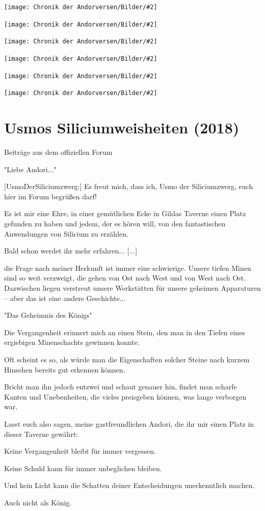\documentclass[10pt, a4paper, oneside]{book}
\newcommand{\fillbreak}{\vspace*{\fill}\columnbreak}
\newcommand{\storytext}[1]{%
    \section{#1}%
    \label{Storytext: #1}%
}
\newcommand{\bildmitts}[2][height=0.32\textwidth,width=0.48\textwidth,keepaspectratio]{%
    \begin{center}
        \texttt{[image: Chronik der Andorversen/Bilder/\#2]}
    \end{center}
}
\begin{document}
\begin{multicols}{2}
\bildmitts{Generic Artwork 1.jpg}
\bildmitts{Generic Artwork 2.jpg}
\bildmitts{Generic Artwork 3.jpg}
\bildmitts{Generic Artwork 4.jpg}
\bildmitts{Artwork Eara Thorn Trolle.jpg}
\bildmitts{Generic Artwork 5.jpg}





\fillbreak
\storytext{Usmos Siliciumweisheiten (2018)}

\begin{center}
    Beiträge aus dem offiziellen Forum

    "Liebe Andori..."
\end{center}

[UsmoDerSiliciumzwerg:] Es freut mich, dass ich, Usmo der Siliciumzwerg, euch hier im Forum begrüßen darf!

Es ist mir eine Ehre, in einer gemütlichen Ecke in Gildas Taverne einen Platz gefunden zu haben und jedem, der es hören will, von den fantastischen Anwendungen von Silicium zu erzählen.

Bald schon werdet ihr mehr erfahren... [...]

die Frage nach meiner Herkunft ist immer eine schwierige. Unsere tiefen Minen sind so weit verzweigt, die gehen von Ost nach West und von West nach Ost. Dazwischen liegen verstreut unsere Werkstätten für unsere geheimen Apparaturen – aber das ist eine andere Geschichte...


\begin{center}
    "Das Geheimnis des Königs"
\end{center}

Die Vergangenheit erinnert mich an einen Stein, den man in den Tiefen eines ergiebigen Minenschachts gewinnen konnte. 

Oft scheint es so, als würde man die Eigenschaften solcher Steine nach kurzem Hinsehen bereits gut erkennen können.

Bricht man ihn jedoch entzwei und schaut genauer hin, findet man scharfe Kanten und Unebenheiten, die vieles preisgeben können, was lange verborgen war.

Lasst euch also sagen, meine gastfreundlichen Andori, die ihr mir einen Platz in dieser Taverne gewährt:

Keine Vergangenheit bleibt für immer vergessen.

Keine Schuld kann für immer unbeglichen bleiben.

Und kein Licht kann die Schatten deiner Entscheidungen unerkenntlich machen.

Auch nicht als König.


\end{multicols}
\end{document}
